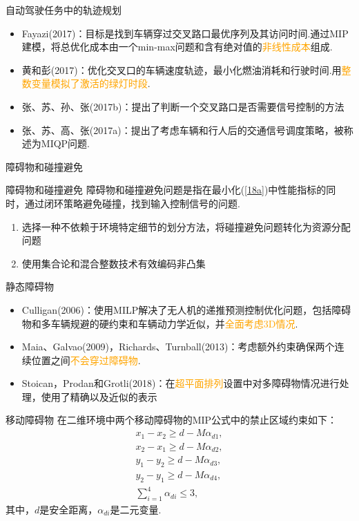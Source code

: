 \documentclass[notheorems,11pt]{beamer}
\theoremstyle{plain}
\numberwithin{theorem}{section}
\numberwithin{lemma}{section}
\numberwithin{corollary}{section}
\theoremstyle{example}
\newcommand{\hl}[1]{\textcolor{orange}{#1}}
\begin{document}
\begin{frame}{自动驾驶任务中的轨迹规划}
  \begin{itemize}
    \item Fayazi(2017)：目标是找到车辆穿过交叉路口最优序列及其访问时间.通过MIP建模，将总优化成本由一个min-max问题和含有绝对值的\hl{非线性成本}组成.
    \item 黄和彭(2017)：优化交叉口的车辆速度轨迹，最小化燃油消耗和行驶时间.用\hl{整数变量模拟了激活的绿灯时段}.
    \item 张、苏、孙、张(2017b)：提出了判断一个交叉路口是否需要信号控制的方法
    \item 张、苏、高、张(2017a)：提出了考虑车辆和行人后的交通信号调度策略，被称述为MIQP问题.
  \end{itemize}
\end{frame}

\begin{frame}{障碍物和碰撞避免}
  \begin{block}{障碍物和碰撞避免}
    障碍物和碰撞避免问题是指在最小化(\ref{18a})中性能指标的同时，通过闭环策略避免碰撞，找到输入控制信号的问题.
  \end{block}
  \begin{enumerate}
    \item 选择一种不依赖于环境特定细节的划分方法，将碰撞避免问题转化为资源分配问题
    \item 使用集合论和混合整数技术有效编码非凸集
  \end{enumerate}
\end{frame}

\begin{frame}{静态障碍物}
  \begin{itemize}
    \item Culligan(2006)：使用MILP解决了无人机的递推预测控制优化问题，包括障碍物和多车辆规避的硬约束和车辆动力学近似，并\hl{全面考虑3D情况}.
    \item Maia、Galvao(2009)，Richards、Turnball(2013)：考虑额外约束确保两个连续位置之间\hl{不会穿过障碍物}.
    \item Stoican，Prodan和Grotli(2018)：在\hl{超平面排列}设置中对多障碍物情况进行处理，使用了精确以及近似的表示
  \end{itemize}
\end{frame}

\begin{frame}{移动障碍物}
  在二维环境中两个移动障碍物的MIP公式中的禁止区域约束如下：
  \begin{subequations}
    \begin{gather}
      x_1-x_2\geqslant d-M\alpha_{d1}, \\
      x_2-x_1\geqslant d-M\alpha_{d2}, \\
      y_1-y_2\geqslant d-M\alpha_{d3}, \\
      y_2-y_1\geqslant d-M\alpha_{d4}, \\
      \sum_{i=1}^4{\alpha_{di}}\leqslant 3,
    \end{gather}
  \end{subequations}
  其中，$d$是安全距离，$\alpha_{di}$是二元变量.
\end{frame}
\end{document}
